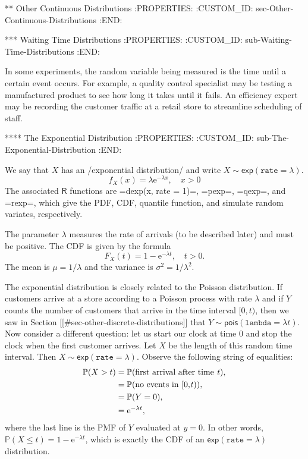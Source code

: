 ** Other Continuous Distributions
:PROPERTIES:
:CUSTOM_ID: sec-Other-Continuous-Distributions
:END:

*** Waiting Time Distributions
:PROPERTIES:
:CUSTOM_ID: sub-Waiting-Time-Distributions
:END:

In some experiments, the random variable being measured is the time
until a certain event occurs. For example, a quality control
specialist may be testing a manufactured product to see how long it
takes until it fails. An efficiency expert may be recording the
customer traffic at a retail store to streamline scheduling of staff.

**** The Exponential Distribution
:PROPERTIES:
:CUSTOM_ID: sub-The-Exponential-Distribution
:END:

We say that \(X\) has an /exponential distribution/ and write
\(X\sim\mathsf{exp}(\mathtt{rate}=\lambda)\).
\begin{equation}
f_{X}(x)=\lambda\mathrm{e}^{-\lambda x},\quad x>0
\end{equation}
The associated \(\mathsf{R}\) functions are =dexp(x, rate = 1)=,
=pexp=, =qexp=, and =rexp=, which give the PDF, CDF, quantile
function, and simulate random variates, respectively.

The parameter \(\lambda\) measures the rate of arrivals (to be
described later) and must be positive. The CDF is given by the formula
\begin{equation}
F_{X}(t)=1-\mathrm{e}^{-\lambda t},\quad t>0.
\end{equation}
The mean is \(\mu=1/\lambda\) and the variance is
\(\sigma^{2}=1/\lambda^{2}\).

The exponential distribution is closely related to the Poisson
distribution. If customers arrive at a store according to a Poisson
process with rate \(\lambda\) and if \(Y\) counts the number of
customers that arrive in the time interval \([0,t)\), then we saw in
Section [[#sec-other-discrete-distributions]] that \( Y \sim
\mathsf{pois}(\mathtt{lambda}=\lambda t). \) Now consider a different
question: let us start our clock at time 0 and stop the clock when the
first customer arrives. Let \(X\) be the length of this random time
interval. Then \(X\sim\mathsf{exp}(\mathtt{rate}=\lambda)\). Observe
the following string of equalities:
\begin{align*}
\mathbb{P}(X>t) & =\mathbb{P}(\mbox{first arrival after time \emph{t}}),\\
 & =\mathbb{P}(\mbox{no events in [0,\emph{t})}),\\
 & =\mathbb{P}(Y=0),\\
 & =\mathrm{e}^{-\lambda t},
\end{align*}
where the last line is the PMF of \(Y\) evaluated at \(y=0\). In other
words, \(\mathbb{P}(X\leq t)=1-\mathrm{e}^{-\lambda t}\), which is
exactly the CDF of an \(\mathsf{exp}(\mathtt{rate}=\lambda)\)
distribution.

